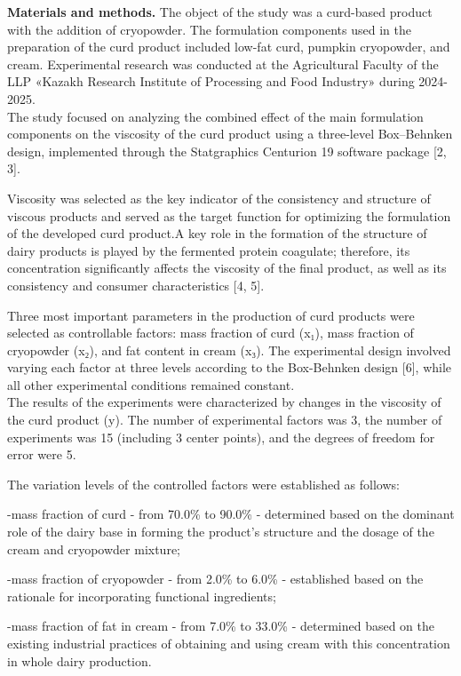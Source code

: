{\bfseries Materials and methods.} The object of the study was a curd-based
product with the addition of cryopowder. The formulation components used
in the preparation of the curd product included low-fat curd, pumpkin
cryopowder, and cream. Experimental research was conducted at the
Agricultural Faculty of the LLP «Kazakh Research Institute of Processing
and Food Industry» during 2024-2025.\\
The study focused on analyzing the combined effect of the main
formulation components on the viscosity of the curd product using a
three-level Box--Behnken design, implemented through the Statgraphics
Centurion 19 software package {[}2, 3{]}.

Viscosity was selected as the key indicator of the consistency and
structure of viscous products and served as the target function for
optimizing the formulation of the developed curd product.A key role in
the formation of the structure of dairy products is played by the
fermented protein coagulate; therefore, its concentration significantly
affects the viscosity of the final product, as well as its consistency
and consumer characteristics {[}4, 5{]}.

Three most important parameters in the production of curd products were
selected as controllable factors: mass fraction of curd (x₁), mass
fraction of cryopowder (x₂), and fat content in cream (x₃). The
experimental design involved varying each factor at three levels
according to the Box-Behnken design {[}6{]}, while all other
experimental conditions remained constant.\\
The results of the experiments were characterized by changes in the
viscosity of the curd product (y). The number of experimental factors
was 3, the number of experiments was 15 (including 3 center points), and
the degrees of freedom for error were 5.

The variation levels of the controlled factors were established as
follows:

-mass fraction of curd - from 70.0\% to 90.0\% - determined based on the
dominant role of the dairy base in forming the product's structure and
the dosage of the cream and cryopowder mixture;

-mass fraction of cryopowder - from 2.0\% to 6.0\% - established based
on the rationale for incorporating functional ingredients;

-mass fraction of fat in cream - from 7.0\% to 33.0\%
- determined based on the existing industrial practices of obtaining and
using cream with this concentration in whole dairy production.

